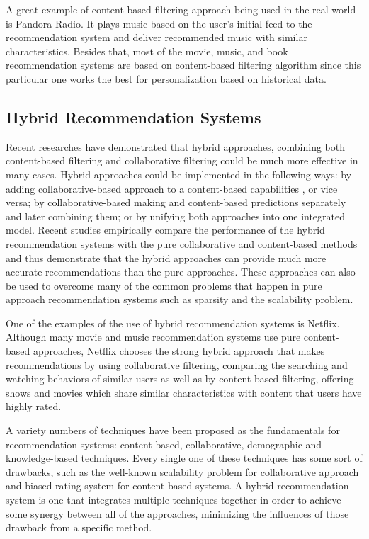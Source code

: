 \documentclass[sigconf]{acmart}
\begin{document}
\par A great example of content-based filtering approach being used in the real world is Pandora Radio. It plays music based on the user's initial feed to the recommendation system and deliver recommended music with similar characteristics. Besides that, most of the movie, music, and book recommendation systems are based on content-based filtering algorithm since this particular one works the best for personalization based on historical data.


\subsection{Hybrid Recommendation Systems}
Recent researches have demonstrated that hybrid approaches, combining both content-based filtering and collaborative filtering could be much more effective in many cases. Hybrid approaches could be implemented in the following ways: by adding collaborative-based approach to a content-based capabilities , or vice versa; by collaborative-based making and content-based predictions separately and later combining them; or by unifying both approaches into one integrated model.\cite{Standford} Recent studies empirically compare the performance of the hybrid recommendation systems with the pure collaborative and content-based methods and thus demonstrate that the hybrid approaches can provide much more accurate recommendations than the pure approaches.\cite{Standford} These approaches can also be used to overcome many of the common problems that happen in pure approach recommendation systems such as sparsity and the scalability problem.

\par One of the examples of the use of hybrid recommendation systems is Netflix. Although many movie and music recommendation systems use pure content-based approaches, Netflix chooses the strong hybrid approach that makes recommendations by using collaborative filtering, comparing the searching and watching behaviors of similar users as well as by content-based filtering, offering shows and movies which share similar characteristics with content that users have highly rated.\cite{Standford}

\par A variety numbers of techniques have been proposed as the fundamentals for recommendation systems: content-based, collaborative, demographic and knowledge-based techniques. Every single one of these techniques has some sort of drawbacks, such as the well-known scalability problem for collaborative approach and biased rating system for content-based systems.\cite{Standford} A hybrid recommendation system is one that integrates multiple techniques together in order to achieve some synergy between all of the approaches, minimizing the influences of those drawback from a specific method.
\end{document}
